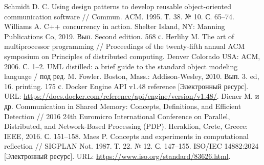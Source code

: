 \documentclass[a4paper, 14pt]{extreport}
\begin{document}
\begin{thebibliography}{9}
         Schmidt D. C. Using design patterns to develop reusable object-oriented communication software // Commun. ACM. 1995. Т. 38. № 10. С. 65–74.
         Williams A. C++ concurrency in action. Shelter Island, NY: Manning Publications Co, 2019. Вып. Second edition. 568 с.
          Herlihy M. The art of multiprocessor programming // Proceedings of the twenty-fifth annual ACM symposium on Principles of distributed computing. Denver Colorado USA: ACM, 2006. С. 1–2.
         UML distilled: a brief guide to the standard object modeling language / под ред. M. Fowler. Boston, Mass.: Addison-Wesley, 2010. Вып. 3. ed, 16. printing. 175 с.
         Docker Engine API v1.48 reference [Электронный ресурс]. URL: \url{https://docs.docker.com/reference/api/engine/version/v1.48/}.
         Diener M. и др. Communication in Shared Memory: Concepts, Definitions, and Efficient Detection // 2016 24th Euromicro International Conference on Parallel, Distributed, and Network-Based Processing (PDP). Heraklion, Crete, Greece: IEEE, 2016. С. 151–158.
         Maes P. Concepts and experiments in computational reflection // SIGPLAN Not. 1987. Т. 22. № 12. С. 147–155.
         ISO/IEC 14882:2024 [Электронный ресурс]. URL: \url{https://www.iso.org/standard/83626.html}.
\end{thebibliography} 
\end{document}
